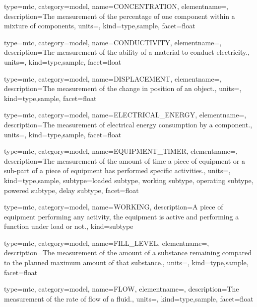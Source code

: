 {
  type=mtc,
  category=model,
  name={CONCENTRATION},
  elementname=,
  description={The measurement of the percentage of one component within a mixture of components},
  units=,
  kind={type,sample},
  facet={\gls{float}}
}


{
  type=mtc,
  category=model,
  name={CONDUCTIVITY},
  elementname=,
  description={The measurement of the ability of a material to conduct electricity.},
  units=,
  kind={type,sample},
  facet={\gls{float}}
}


{
  type=mtc,
  category=model,
  name={DISPLACEMENT},
  elementname=,
  description={The measurement of the change in position of an object.},
  units=,
  kind={type,sample},
  facet={\gls{float}}
}


{
  type=mtc,
  category=model,
  name={ELECTRICAL\_ENERGY},
  elementname=,
  description={The measurement of electrical energy consumption by a component.},
  units=,
  kind={type,sample},
  facet={\gls{float}}
}


{
  type=mtc,
  category=model,
  name={EQUIPMENT\_TIMER},
  elementname=,
  description={The measurement of the amount of time a piece of equipment or a sub-part of a piece of equipment has performed specific activities.},
  units=,
  kind={type,sample},
  subtype={\gls{loaded subtype}, \gls{working subtype}, \gls{operating subtype}, \gls{powered subtype}, \gls{delay subtype}},
  facet={\gls{float}}
}



{
  type=mtc,
  category=model,
  name={WORKING},
  description={A piece of equipment performing any activity, the equipment is active and performing a function under load or not.},
  kind={subtype}
}


{
  type=mtc,
  category=model,
  name={FILL\_LEVEL},
  elementname=,
  description={The measurement of the amount of a substance remaining compared to the planned maximum amount of that substance.},
  units=,
  kind={type,sample},
  facet={\gls{float}}
}


{
  type=mtc,
  category=model,
  name={FLOW},
  elementname=,
  description={The measurement of the rate of flow of a fluid.},
  units=,
  kind={type,sample},
  facet={\gls{float}}
}


